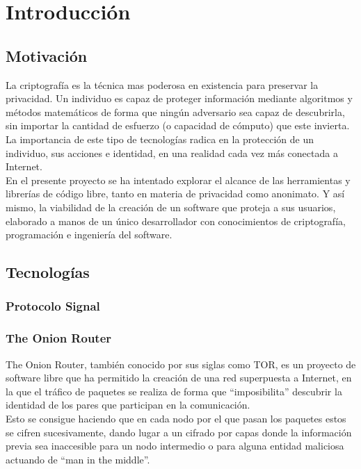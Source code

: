 \chapter{Introducción}

\section {Motivación}

La criptografía es la técnica mas poderosa en existencia para preservar la privacidad. Un individuo es capaz de proteger información mediante algoritmos y métodos matemáticos de forma que ningún adversario sea capaz de descubrirla, sin importar la cantidad de esfuerzo (o capacidad de cómputo) que este invierta. \\

La importancia de este tipo de tecnologías radica en la protección de un individuo, sus acciones e identidad, en una realidad cada vez más conectada a Internet. \\

En el presente proyecto se ha intentado explorar el alcance de las herramientas y librerías de código libre, tanto en materia de privacidad como anonimato. Y así mismo, la viabilidad de la creación de un software que proteja a sus usuarios, elaborado a manos de un único desarrollador con conocimientos de criptografía, programación e ingeniería del software.


\section {Tecnologías}
\subsection {Protocolo Signal}
\subsection {The Onion Router}

The Onion Router, también conocido por sus siglas como TOR, es un proyecto de software libre que ha permitido la creación de una red superpuesta a Internet, en la que el tráfico de paquetes se realiza de forma que \hyphenquote{spanish}{imposibilita} descubrir la identidad de los pares que participan en la comunicación. \\

Esto se consigue haciendo que en cada nodo por el que pasan los paquetes estos se cifren sucesivamente, dando lugar a un cifrado por capas donde la información previa sea inaccesible para un nodo intermedio o para alguna entidad maliciosa actuando de \hyphenquote{spanish}{man in the middle}. \\

